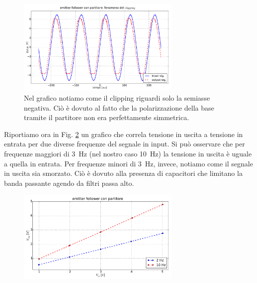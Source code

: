 \begin{figure}[h]
\centering
	\includegraphics[width=0.7\textwidth]{clip.pdf}
	\caption{Nel grafico notiamo come il clipping riguardi solo la semiasse negativa. Ciò è dovuto al fatto che la polarizzazione della base tramite il partitore non era perfettamente simmetrica.}
	\label{fig:clip}
\end{figure}

Riportiamo ora in Fig. \ref{fig:am} un grafico che correla tensione in uscita a tensione in entrata per due diverse frequenze del segnale in input.
Si può osservare che per frequenze maggiori di \SI{3}{\hertz} (nel nostro caso \SI{10}{\hertz}) la tensione in uscita è uguale a quella in entrata.
Per frequenze minori di \SI{3}{\hertz}, invece, notiamo come il segnale in uscita sia smorzato.
Ciò è dovuto alla presenza di capacitori che limitano la banda passante agendo da filtri passa alto.

\begin{figure}[H]
\centering
	\includegraphics[width=0.7\textwidth]{am.pdf}
	\caption{}
	\label{fig:am}
\end{figure}